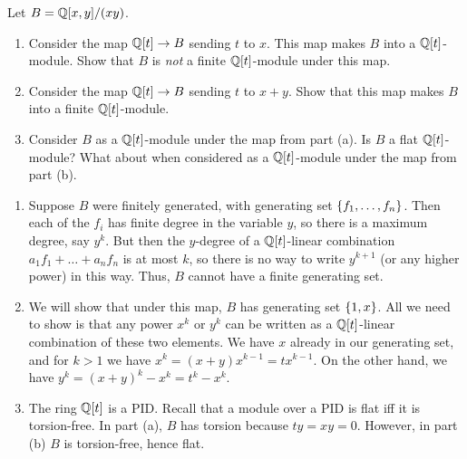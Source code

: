 \begin{question}[subtitle = {August 2017 Problem 5, modified},ID=Aug17_5]
Let $B = \mathbb{Q}[x,y]/(xy)$.
\begin{enumerate}
    \item Consider the map $\mathbb{Q}[t] \to B$ sending $t$ to $x$. This map makes $B$ into a $\mathbb{Q}[t]$-module. Show that $B$ is \emph{not} a finite $\mathbb{Q}[t]$-module under this map.
    \item Consider the map $\mathbb{Q}[t] \to B$ sending $t$ to $x+y$. Show that this map makes $B$ into a finite $\mathbb{Q}[t]$-module.
    \item Consider $B$ as a $\mathbb{Q}[t]$-module under the map from part (a). Is $B$ a flat $\mathbb{Q}[t]$-module?  What about when considered as a $\mathbb{Q}[t]$-module under the map from part (b).
\end{enumerate}
\end{question}
\begin{solution}
\begin{enumerate}
    \item Suppose $B$ were finitely generated, with generating set $\{f_1,\dots,f_n\}$. Then each of the $f_i$ has finite degree in the variable $y$, so there is a maximum degree, say $y^k$. But then the $y$-degree of a $\mathbb{Q}[t]$-linear combination $a_1f_1 + \dots + a_nf_n$ is at most $k$, so there is no way to write $y^{k+1}$ (or any higher power) in this way. Thus, $B$ cannot have a finite generating set.
    \item We will show that under this map, $B$ has generating set $\{1,x\}$. All we need to show is that any power $x^k$ or $y^k$ can be written as a $\mathbb{Q}[t]$-linear combination of these two elements. We have $x$ already in our generating set, and for $k > 1$ we have $x^k = (x+y)x^{k-1} = tx^{k-1}$. On the other hand, we have $y^k = (x+y)^k - x^k = t^k - x^k$.
    \item The ring $\mathbb{Q}[t]$ is a PID. Recall that a module over a PID is flat iff it is torsion-free. In part (a), $B$ has torsion because $ty = xy = 0$. However, in part (b) $B$ is torsion-free, hence flat.
\end{enumerate}
\end{solution}

